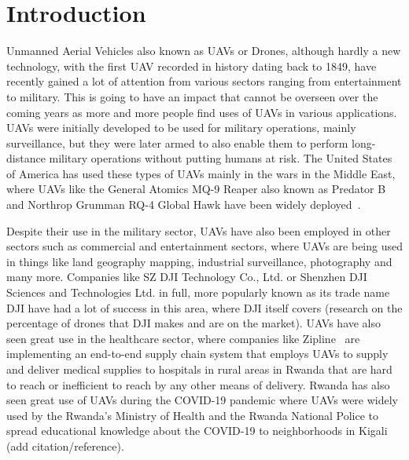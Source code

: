 
\chapter{Introduction}

Unmanned Aerial Vehicles also known as UAVs or Drones, although hardly a new technology, with the first UAV recorded in history dating back to 1849, have recently gained a lot of attention from various sectors ranging from entertainment to military. This is going to have an impact that cannot be overseen over the coming years as more and more people find uses of UAVs in various applications. UAVs were initially developed to be used for military operations, mainly surveillance, but they were later armed to also enable them to perform long-distance military operations without putting humans at risk. The United States of America has used these types of UAVs mainly in the wars in the Middle East, where UAVs like the General Atomics MQ-9 Reaper also known as Predator B and Northrop Grumman RQ-4 Global Hawk have been widely deployed~\cite{samaanorientxxi2022}.

Despite their use in the military sector, UAVs have also been employed in other sectors such as commercial and entertainment sectors, where UAVs are being used in things like land geography mapping, industrial surveillance, photography and many more. Companies like SZ DJI Technology Co., Ltd. or Shenzhen DJI Sciences and Technologies Ltd. in full, more popularly known as its trade name DJI have had a lot of success in this area, where DJI itself covers (research on the percentage of drones that DJI makes and are on the market). UAVs have also seen great use in the healthcare sector, where companies like Zipline~\cite{droneslevy2022} are implementing an end-to-end supply chain system that employs UAVs to supply and deliver medical supplies to hospitals in rural areas in Rwanda that are hard to reach or inefficient to reach by any other means of delivery. Rwanda has also seen great use of UAVs during the COVID-19 pandemic where UAVs were widely used by the Rwanda’s Ministry of Health and the Rwanda National Police to spread educational knowledge about the COVID-19 to neighborhoods in Kigali (add citation/reference).


